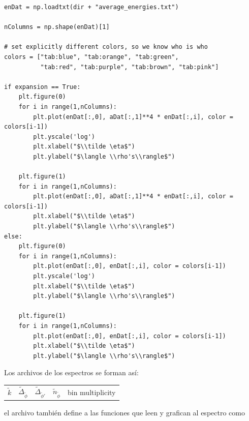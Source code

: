 \begin{lstlisting}[style = pythonStyle]
enDat = np.loadtxt(dir + "average_energies.txt")

nColumns = np.shape(enDat)[1]

# set explicitly different colors, so we know who is who
colors = ["tab:blue", "tab:orange", "tab:green", 
          "tab:red", "tab:purple", "tab:brown", "tab:pink"]

if expansion == True:
    plt.figure(0)
    for i in range(1,nColumns):
        plt.plot(enDat[:,0], aDat[:,1]**4 * enDat[:,i], color = colors[i-1])
        plt.yscale('log')
        plt.xlabel("$\\tilde \eta$")
        plt.ylabel("$\langle \\rho's\\rangle$")
        
    plt.figure(1)
    for i in range(1,nColumns):
        plt.plot(enDat[:,0], aDat[:,1]**4 * enDat[:,i], color = colors[i-1])
        plt.xlabel("$\\tilde \eta$")
        plt.ylabel("$\langle \\rho's\\rangle$")
else:
    plt.figure(0)
    for i in range(1,nColumns):
        plt.plot(enDat[:,0], enDat[:,i], color = colors[i-1])
        plt.yscale('log')
        plt.xlabel("$\\tilde \eta$")
        plt.ylabel("$\langle \\rho's\\rangle$")
        
    plt.figure(1)
    for i in range(1,nColumns):
        plt.plot(enDat[:,0], enDat[:,i], color = colors[i-1])
        plt.xlabel("$\\tilde \eta$")
        plt.ylabel("$\langle \\rho's\\rangle$")
\end{lstlisting}

Los archivos de los espectros se forman así:

\begin{center}
    \begin{tabular}{|c|c|c|c|c|}
        $\tilde k$ & $\tilde\Delta_{\tilde\phi}$ & $\tilde\Delta_{\tilde\phi'}$ & $\tilde n_{\tilde\phi}$ & bin multiplicity
    \end{tabular}
\end{center}

\noindent
el archivo también define a las funciones que leen y grafican al espectro como

